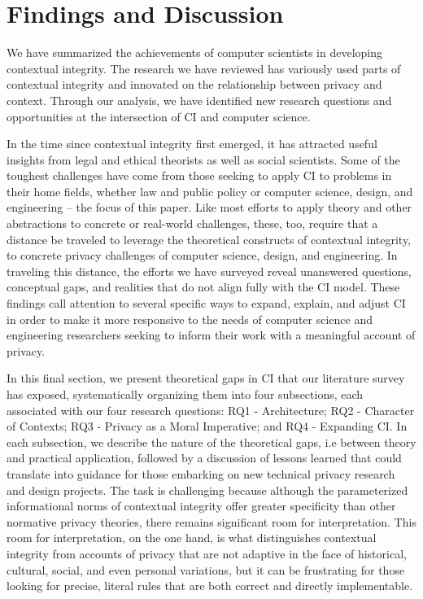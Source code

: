 \documentclass[../thesis.tex]{subfiles}
\begin{document}
\section{Findings and Discussion}
\label{CI5}

We have summarized the achievements of
computer scientists in developing contextual integrity. The research we
have reviewed has variously used parts of contextual integrity and
innovated on the relationship between privacy and context. Through our
analysis, we have identified new research questions and opportunities
at the intersection of CI and computer science.

In the time since contextual integrity
first emerged, it has attracted useful insights from legal and ethical
theorists as well as social scientists. Some of the toughest challenges
have come from those seeking to apply CI to problems in their home
fields, whether law and public policy or computer science, design, and
engineering -- the focus of this paper. Like most efforts to apply
theory and other abstractions to concrete or real-world challenges,
these, too, require that a distance be traveled to leverage the
theoretical constructs of contextual integrity, to concrete privacy
challenges of computer science, design, and engineering. In traveling
this distance, the efforts we have surveyed reveal unanswered
questions, conceptual gaps, and realities that do not align fully with
the CI model. These findings call attention to several specific ways to
expand, explain, and adjust CI in order to make it more responsive to
the needs of computer science and engineering researchers seeking to
inform their work with a meaningful account of privacy. 

In this final section, we present
theoretical gaps in CI
that our literature survey has exposed,
systematically organizing them into four subsections, each associated
with our four research questions: RQ1 - Architecture; RQ2 - Character
of Contexts; RQ3 - Privacy as a Moral Imperative; and RQ4 - Expanding
CI. In each subsection, we describe the nature of the theoretical gaps,
i.e between theory and practical application, followed by a discussion
of lessons learned that could translate into guidance for those
embarking on new technical privacy research and design projects. The
task is challenging because although the parameterized informational
norms of contextual integrity offer greater specificity than other
normative privacy theories, there remains significant room for
interpretation. This room for interpretation, on the one hand, is what
distinguishes contextual integrity from accounts of privacy that are
not adaptive in the face of historical, cultural, social, and even
personal variations, but it can be frustrating for those looking for
precise, literal rules that are both correct and directly
implementable. 
\end{document}
